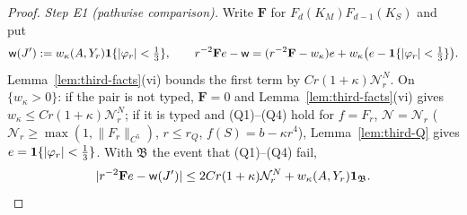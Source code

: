 \begin{proof}
\emph{Step E1 (pathwise comparison).} Write $\mathbf F$ for $F_d(K_M)F_{d-1}(K_S)$ and put
\[
\mathsf w(J'):=w_\kappa(A,Y_r)\mathbf 1\{|\varphi_r|<\tfrac13\},\qquad r^{-2}\mathbf Fe-\mathsf w=(r^{-2}\mathbf F-w_\kappa)e+w_\kappa\bigl(e-\mathbf 1\{|\varphi_r|<\tfrac13\}\bigr).
\]
Lemma~\ref{lem:third-facts}(vi) bounds the first term by $Cr(1+\kappa)\mathcal N_r^N$. On $\{w_\kappa>0\}$: if the pair is not typed, $\mathbf F=0$ and Lemma~\ref{lem:third-facts}(vi) gives $w_\kappa\le Cr(1+\kappa)\mathcal N_r^N$; if it is typed and (Q1)--(Q4) hold for $f=F_r$, $\mathcal N=\mathcal N_r$ ($\mathcal N_r\ge\max(1,\|F_r\|_{C^5})$, $r\le r_Q$, $f(S)=b-\kappa r^4$), Lemma~\ref{lem:third-Q} gives $e=\mathbf 1\{|\varphi_r|<\frac13\}$. With $\mathfrak B$ the event that (Q1)--(Q4) fail,
\begin{equation}\label{eq:third-E1}
|r^{-2}\mathbf Fe-\mathsf w(J')|\le2Cr(1+\kappa)\mathcal N_r^N+w_\kappa(A,Y_r)\mathbf 1_{\mathfrak B}.
\end{equation}


\end{proof}
